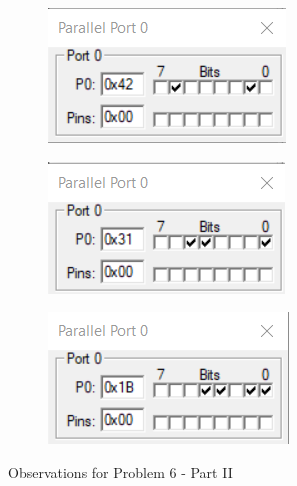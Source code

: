 \documentclass{lab_sheet}
\begin{document}
\begin{figure}[H]
\begin{subfigure}{.5\textwidth}
  \label{fig:prob6b-g}
  \caption{}
\end{subfigure}
\begin{subfigure}{.5\textwidth}
  \centering
  \includegraphics[frame,width=.8\linewidth]{../Figures/1_6_c.png}   
  \caption{}
  \label{fig:prob6b-h}
\end{subfigure}
\begin{subfigure}{.5\textwidth}
  \centering
    \includegraphics[frame,width=.8\linewidth]{../Figures/1_6_b.png}  
  \label{fig:prob6b-i}
  \caption{}
\end{subfigure}
\begin{subfigure}{.5\textwidth}
  \centering
  \includegraphics[frame,width=.8\linewidth]{../Figures/1_6_a.png}   
  \caption{}
  \label{fig:prob6b-j}
\end{subfigure}
\caption{Observations for Problem 6 - Part II}
\label{fig:prob6b}
\end{figure}
\end{document}
